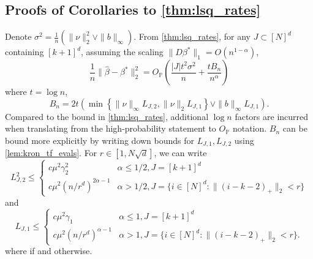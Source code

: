 \documentclass[ejs,noshowframe]{imsart}
\theoremstyle{plain}
\theoremstyle{definition}
\renewcommand{\P}{\mathbb{P}}
\newcommand{\norm}[1]{\left\lVert #1 \right\rVert}
\newcommand{\snorm}[1]{\lVert #1 \rVert}
\renewcommand{\hat}{\widehat}
\begin{document}
\begin{appendix}
\subsection{Proofs of Corollaries to \autoref{thm:lsq_rates}}
\label{sec:lsq_homosked_proof}
Denote $\sigma^2 = \frac{1}{n} (\| \nu \|_2^2 \vee \|b\|_\infty)$.
	From \autoref{thm:lsq_rates}, for any $J \subset [N]^d$ containing $[k+1]^d$,
	assuming the scaling $\|D\beta^* \|_1 = O( n^{1-\alpha} )$,
\begin{equation}
	\label{eq:lsq_rates_result}
	\frac{1}{n}\snorm{ \hat\beta - \beta^* }_2^2 
	= O_\P \left( \frac{|J| t^2 \sigma^2 }{n} + \frac{t B_n}{n^\alpha}\right)
\end{equation}
where $t=\log n$, 
\begin{equation}
	\label{eq:Bn}
B_n = 2t\left( 
\min\left\{ \|\nu\|_\infty  L_{J,2}, 
\|\nu\|_2 L_{J,1} \right\}
\vee  \| b \|_\infty L_{J,1}\right).
\end{equation}
 Compared to the bound in \autoref{thm:lsq_rates}, additional $\log n$ 
 factors 
 are incurred when translating from the high-probability 
statement to $O_\P$ notation.
$B_n$ can be bound more explicitly by writing down bounds for $L_{J,1}, 
L_{J,2}$
using \autoref{lem:kron_tf_evals}. For $r \in [1, N\sqrt{d}]$, we can write
\begin{equation}
	\label{eq:LJ2}
	L_{J,2}^2 \leq \begin{cases}
		c \mu^2 \gamma_2^2  & \alpha \leq 1/2, J = [k+1]^d\\
		c \mu^2 (n/r^d)^{2\alpha - 1} & \alpha > 1/2, J = \{ i \in  [N]^d : \| 
		(i - k - 2)_+ \|_2 < r\}
	\end{cases}
\end{equation}
and 
\begin{equation}
	\label{eq:LJ1}
	L_{J,1} \leq \begin{cases}
		c \mu^2 \gamma_1  & \alpha \leq 1, J = [k+1]^d\\
		c \mu^2 (n/r^d)^{\alpha - 1} & \alpha > 1, J = \{ i \in  [N]^d : \| 
		(i - k - 2)_+ \|_2 < r\}.
	\end{cases}
\end{equation}
where  if  and 
 otherwise.



\end{appendix}
\end{document}

